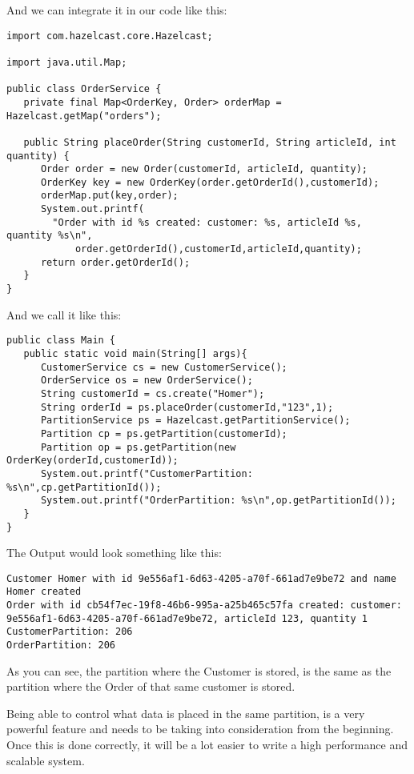 And we can integrate it in our code like this:

\begin{verbatim}
import com.hazelcast.core.Hazelcast;

import java.util.Map;

public class OrderService {
   private final Map<OrderKey, Order> orderMap = Hazelcast.getMap("orders");

   public String placeOrder(String customerId, String articleId, int quantity) {
      Order order = new Order(customerId, articleId, quantity);
      OrderKey key = new OrderKey(order.getOrderId(),customerId);
      orderMap.put(key,order);
      System.out.printf(
		"Order with id %s created: customer: %s, articleId %s, quantity %s\n",
         	order.getOrderId(),customerId,articleId,quantity);
      return order.getOrderId();
   }
}
\end{verbatim}

And we call it like this:

\begin{verbatim}
public class Main {
   public static void main(String[] args){
      CustomerService cs = new CustomerService();
      OrderService os = new OrderService();
      String customerId = cs.create("Homer");
      String orderId = ps.placeOrder(customerId,"123",1);
      PartitionService ps = Hazelcast.getPartitionService();
      Partition cp = ps.getPartition(customerId);
      Partition op = ps.getPartition(new OrderKey(orderId,customerId));
      System.out.printf("CustomerPartition: %s\n",cp.getPartitionId());
      System.out.printf("OrderPartition: %s\n",op.getPartitionId());
   }
}
\end{verbatim}

The Output would look something like this:

\begin{verbatim}
Customer Homer with id 9e556af1-6d63-4205-a70f-661ad7e9be72 and name Homer created
Order with id cb54f7ec-19f8-46b6-995a-a25b465c57fa created: customer: 9e556af1-6d63-4205-a70f-661ad7e9be72, articleId 123, quantity 1
CustomerPartition: 206
OrderPartition: 206
\end{verbatim}

As you can see, the partition where the Customer is stored, is the same as the partition where the Order of that same customer is stored. 

Being able to control what data is placed in the same partition, is a very powerful feature and needs to be taking into consideration from the beginning. Once this is done correctly, it will be a lot easier to write a high performance and scalable system. 


